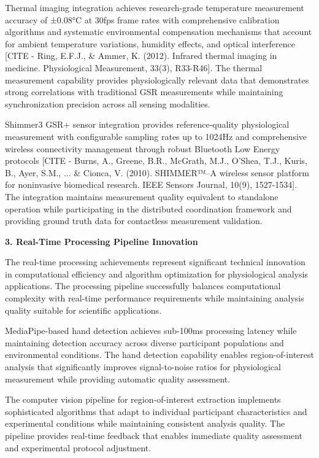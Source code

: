 \documentclass[11pt,a4paper]{report}
\begin{document}
Thermal imaging integration achieves research-grade temperature measurement accuracy of ±0.08°C at 30fps frame rates
with comprehensive calibration algorithms and systematic environmental compensation mechanisms that account for ambient
temperature variations, humidity effects, and optical
interference [CITE - Ring, E.F.J., \& Ammer, K. (2012). Infrared thermal imaging in medicine. Physiological Measurement, 33(3), R33-R46].
The thermal measurement capability provides physiologically relevant data that demonstrates strong correlations with
traditional GSR measurements while maintaining synchronization precision across all sensing modalities.

Shimmer3 GSR+ sensor integration provides reference-quality physiological measurement with configurable sampling rates
up to 1024Hz and comprehensive wireless connectivity management through robust Bluetooth Low Energy
protocols [CITE - Burns, A., Greene, B.R., McGrath, M.J., O'Shea, T.J., Kuris, B., Ayer, S.M., ... \& Cionca, V. (2010). SHIMMER™–A wireless sensor platform for noninvasive biomedical research. IEEE Sensors Journal, 10(9), 1527-1534].
The integration maintains measurement quality equivalent to standalone operation while participating in the distributed
coordination framework and providing ground truth data for contactless measurement validation.

\textbf{3. Real-Time Processing Pipeline Innovation}

The real-time processing achievements represent significant technical innovation in computational efficiency and
algorithm optimization for physiological analysis applications. The processing pipeline successfully balances
computational complexity with real-time performance requirements while maintaining analysis quality suitable for
scientific applications.

MediaPipe-based hand detection achieves sub-100ms processing latency while maintaining detection accuracy across diverse
participant populations and environmental conditions. The hand detection capability enables region-of-interest analysis
that significantly improves signal-to-noise ratios for physiological measurement while providing automatic quality
assessment.

The computer vision pipeline for region-of-interest extraction implements sophisticated algorithms that adapt to
individual participant characteristics and experimental conditions while maintaining consistent analysis quality. The
pipeline provides real-time feedback that enables immediate quality assessment and experimental protocol adjustment.
\end{document}
